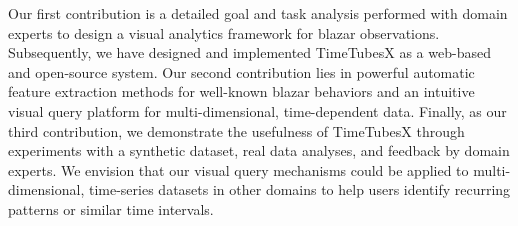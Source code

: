 Our first contribution is a detailed goal and task analysis performed with domain experts to design a visual analytics framework for blazar observations. 
Subsequently, we have designed and implemented TimeTubesX as a web-based and open-source system. 
Our second contribution lies in powerful automatic feature extraction methods for well-known blazar behaviors and an intuitive visual query platform for multi-dimensional, time-dependent data.
Finally, as our third contribution, we demonstrate the usefulness of TimeTubesX through experiments with a synthetic dataset, real data analyses, and feedback by domain experts.
We envision that our visual query mechanisms could be applied to multi-dimensional, time-series datasets in other domains to help users identify recurring patterns or similar time intervals.




